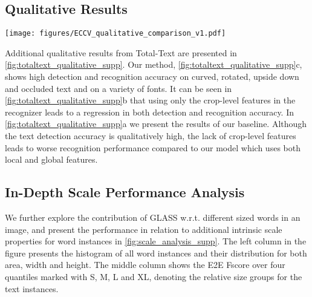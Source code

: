 \documentclass[runningheads]{llncs}
\begin{document}
\subsection{Qualitative Results}
\begin{figure*}[t]
 \centering
  \texttt{[image: figures/ECCV\_qualitative\_comparison\_v1.pdf]}
   \caption{\textbf{Qualitative results on the Total-Text dataset.}
  \textbf{(a)}  Predictions of the baseline experiment, a standard E2E text spotting framework. \textbf{(b)} Predictions of an E2E framework where only the local (crop-level) features are used by the recognizer, and \textbf{(c)} Predictions of our proposed configuration with the GLASS component. Polygons and transcriptions in blue represent correct predictions, and red represents wrong predictions. We observe that an E2E system trained with GLASS is capable of detecting with a higher word recall, and higher recognition accuracy. We recommend enlarging the digital version.}
  \label{fig:totaltext_qualitative_supp}
\end{figure*}
Additional qualitative results from Total-Text are presented in \cref{fig:totaltext_qualitative_supp}.
Our method, \cref{fig:totaltext_qualitative_supp}c, shows high detection and recognition accuracy on curved, rotated, upside down and occluded text and on a variety of fonts.
It can be seen in \cref{fig:totaltext_qualitative_supp}b that using only the crop-level features in the recognizer leads to a regression in both detection and recognition accuracy.
In \cref{fig:totaltext_qualitative_supp}a we present the results of our baseline.
Although the text detection accuracy is qualitatively  high, the lack of crop-level features leads to worse recognition performance compared to our model which uses both local and global features.  

\subsection{In-Depth Scale Performance Analysis}
\label{sec:scale_analysis}

We further explore the contribution of GLASS w.r.t. different sized words in an image, and present the performance in relation to additional intrinsic scale properties for word instances in \cref{fig:scale_analysis_supp}. 
The left column in the figure presents the histogram of all word instances and their distribution for both area, width and height. 
The middle column shows the E2E Fscore over four quantiles marked with S, M, L and XL, denoting the relative size groups for the text instances.
\end{document}

